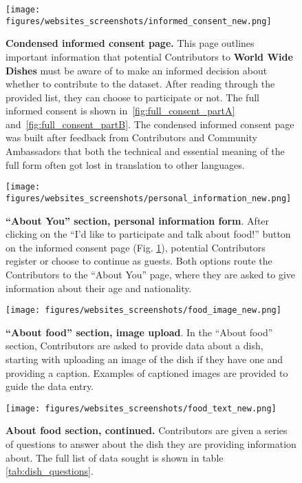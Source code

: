 \begin{figure}[H]
    \centering
    \texttt{[image: figures/websites\_screenshots/informed\_consent\_new.png]}
    \caption{\textbf{Condensed informed consent page.} This page outlines important information that potential Contributors to \textbf{World Wide Dishes} must be aware of to make an informed decision about whether to contribute to the dataset. After reading through the provided list, they can choose to participate or not. The full informed consent is shown in~\cref{fig:full_consent_partA} and~\cref{fig:full_consent_partB}. The condensed informed consent page was built after feedback from Contributors and Community Ambassadors that both the technical and essential meaning of the full form often got lost in translation to other languages.}
    \label{fig:informed_consent_new}
\end{figure}


\begin{figure}[H]
    \centering
    \texttt{[image: figures/websites\_screenshots/personal\_information\_new.png]}
    \caption{\textbf{``About You'' section, personal information form}. After clicking on the ``I'd like to participate and talk about food!'' button on the informed consent page (Fig.  \ref{fig:informed_consent_new}), potential Contributors register or choose to continue as guests. Both options route the Contributors to the ``About You'' page, where they are asked to give information about their age and nationality.}
    \label{fig:personal_information}
\end{figure}

\begin{figure}[H]
    \centering
    \texttt{[image: figures/websites\_screenshots/food\_image\_new.png]}
    \caption{\textbf{``About food'' section, image upload}. In the ``About food'' section, Contributors are asked to provide data about a dish, starting with uploading an image of the dish if they have one and providing a caption. Examples of captioned images are provided to guide the data entry.}
    \label{fig:image_upload}
\end{figure}

\begin{figure}[H]
    \centering
    \texttt{[image: figures/websites\_screenshots/food\_text\_new.png]}
    \caption{\textbf{About food section, continued.} Contributors are given a series of questions to answer about the dish they are providing information about. The full list of data sought is shown in table \ref{tab:dish_questions}.}
    \label{fig:text_upload}
\end{figure}

